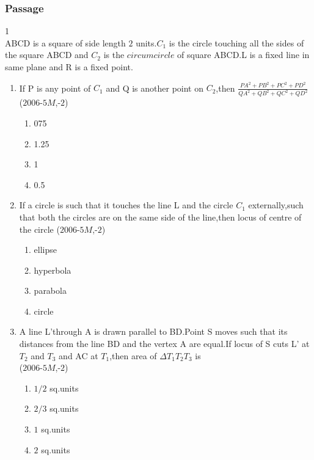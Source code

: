 \documentclass[journal,12pt,twocolumn]{IEEEtran}
\theoremstyle{remark}
\begin{document}
\subsubsection{Passage }
1\\
ABCD is a square of side length $2$ units.$C_1$ is the circle touching all the sides of the square ABCD and $C_2$ is the $circumcircle$ of square ABCD.L is a fixed line in same plane and R is a fixed point.\\
\begin{enumerate}
\item If P is any point of $C_1$ and Q is another point on $C_2$,then $\displaystyle\frac{PA^2+PB^2+PC^2+PD^2}{QA^2+QB^2+QC^2+QD^2}$\\
\hfill ($2006$-$5M$,-$2$)\\
\begin{enumerate}
\item 075\\
\item 1.25\\
\item 1\\
\item 0.5\\
\end{enumerate}
\item If a circle is such that it touches the line L and the circle $C_1$ externally,such that both the circles are on the same side of the line,then locus of centre of the circle 
\hfill($2006$-$5M$,-$2$)
\begin{enumerate}
\item ellipse\\
\item hyperbola\\
\item parabola\\
\item circle\\
\end{enumerate}
\item A line L'through A is drawn parallel to BD.Point S moves such that its distances from the line BD and the vertex A are equal.If locus of S cuts L' at $T_2$ and $T_3$ and AC at $T_1$,then area of $\Delta T_1T_2T_3$ is\\
\hfill($2006$-$5M$,-$2$)\\
\begin{enumerate}
\item $1/2$ sq.units\\
\item $2/3$ sq.units\\
\item $1$ sq.units\\
\item $2$ sq.units\\
\end{enumerate}
\end{enumerate}
\end{document}
